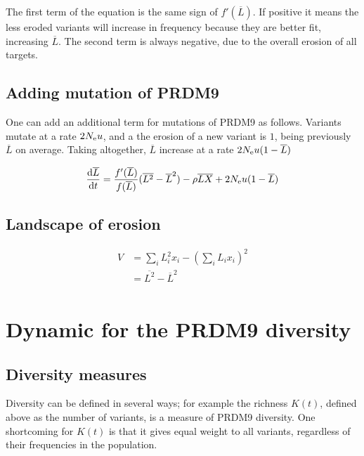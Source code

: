 \documentclass{article}
\begin{document}
The first term of the equation is the same sign of $f'(\overline{L})$. If positive it means the less eroded variants will increase in frequency because they are better fit, increasing $\overline{L}$. The second term is always negative, due to the overall erosion of all targets.

\subsection{Adding mutation of PRDM9}

One can add an additional term for mutations of PRDM9 as follows. Variants mutate at a rate $2 N_\mathrm{e} u$, and a the erosion of a new variant is $1$, being previously $\overline{L}$ on average. Taking altogether, $\overline{L}$ increase at a rate  $2 N_\mathrm{e} u (1 - \overline{L})$

\begin{equation}
  \begin{aligned}
    \dfrac{\mathrm{d} \overline{L} }{\mathrm{d}t} &=
    \dfrac{f'(\overline{L})}{f(\overline{L})} (\overline{L^2} - \overline{L}^2) - \rho \overline{L X} + 2 N_\mathrm{e} u (1 - \overline{L})\\
  \end{aligned}
\end{equation}

\subsection{Landscape of erosion}

\begin{equation}
  \begin{aligned}
    V &=  \sum_i L_i^2 x_i  -  \left( \sum_i L_i x_i \right)^2 \\
    &=
    \overline{L^2} - \overline{L}^2 \\
  \end{aligned}
\end{equation}

\section{Dynamic for the PRDM9 diversity}

\subsection{Diversity measures}
Diversity can be defined in several ways; for example the richness $K(t)$, defined above as the number of variants, is a measure of PRDM9 diversity. One shortcoming for $K(t)$ is that it gives equal weight to all variants, regardless of their frequencies in the population. 
\end{document}
